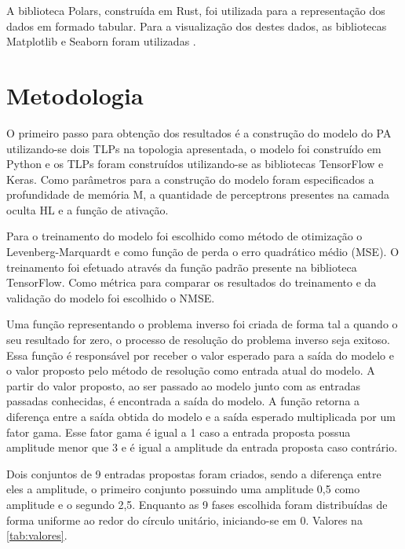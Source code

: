 A biblioteca Polars, construída em Rust, foi utilizada para a representação dos dados em formado tabular. Para a visualização dos destes dados, as bibliotecas Matplotlib e Seaborn foram utilizadas \cite{Hunter:2007} \cite{Waskom2021}.

\section{Metodologia} \label{sec:estudoi-meto}
O primeiro passo para obtenção dos resultados é a construção do modelo do PA utilizando-se dois TLPs na topologia apresentada, o modelo foi construído em Python e os TLPs foram construídos utilizando-se as bibliotecas TensorFlow e Keras. Como parâmetros para a construção do modelo foram especificados a profundidade de memória M, a quantidade de perceptrons presentes na camada oculta HL e a função de ativação.

Para o treinamento do modelo foi escolhido como método de otimização o Levenberg-Marquardt e como função de perda o erro quadrático médio (MSE). O treinamento foi efetuado através da função padrão presente na biblioteca TensorFlow. Como métrica para comparar os resultados do treinamento e da validação do modelo foi escolhido o NMSE.

Uma função representando o problema inverso foi criada de forma tal a quando o seu resultado for zero, o processo de resolução do problema inverso seja exitoso. Essa função é responsável por receber o valor esperado para a saída do modelo e o valor proposto pelo método de resolução como entrada atual do modelo. A partir do valor proposto, ao ser passado ao modelo junto com as entradas passadas conhecidas, é encontrada a saída do modelo. A função retorna a diferença entre a saída obtida do modelo e a saída esperado multiplicada por um fator gama. Esse fator gama é igual a 1 caso a entrada proposta possua amplitude menor que 3 e é igual a amplitude da entrada proposta caso contrário.

Dois conjuntos de 9 entradas propostas foram criados, sendo a diferença entre eles a amplitude, o primeiro conjunto possuindo uma amplitude 0,5 como amplitude e o segundo 2,5. Enquanto as 9 fases escolhida foram distribuídas de forma uniforme ao redor do círculo unitário, iniciando-se em 0. Valores na \autoref{tab:valores}.

